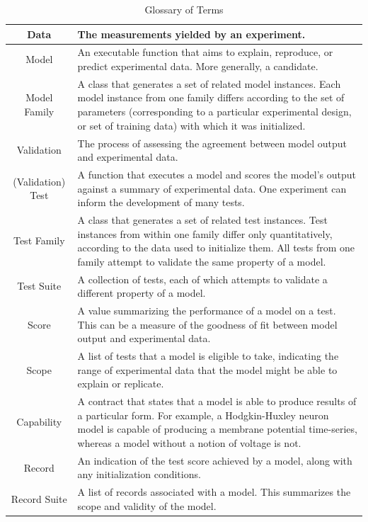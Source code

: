 \documentclass[11pt,letterpaper]{article}
\begin{document}
\begin{table}[h]\footnotesize
\caption{Glossary of Terms}
\label{table:glossary}
\begin{tabular}{| c | p{13cm} |}
\hline
Data & The measurements yielded by an experiment.\\ \hline  
Model & An executable function that aims to explain, reproduce, or predict experimental data.  More generally, a candidate.\\ \hline
Model Family & A class that generates a set of related model instances. Each model instance from one family differs according to the set of parameters (corresponding to a particular experimental design, or set of training data) with which it was initialized.\\ \hline  
Validation	 & The process of assessing the agreement between model output and experimental data.\\ \hline
(Validation) Test & A function that executes a model and scores the model’s output against a summary of experimental data. One experiment can inform the development of many tests.\\ \hline  
Test Family & A class that generates a set of related test instances.  Test instances from within one family differ only quantitatively, according to the data used to initialize them.  All tests from one family attempt to validate the same property of a model.\\ \hline
Test Suite & A collection of tests, each of which attempts to validate a different property of a model.\\ \hline  
Score & A value summarizing the performance of a model on a test. This can be a measure of the goodness of fit between model output and experimental data.\\ \hline
Scope & A list of tests that a model is eligible to take, indicating the range of experimental data that the model might be able to explain or replicate.\\ \hline
Capability & 	A contract that states that a model is able to produce results of a particular form. For example, a Hodgkin-Huxley neuron model is capable of producing a membrane potential time-series, whereas a model without a notion of voltage is not.\\ \hline
Record & An indication of the test score achieved by a model, along with any initialization conditions.\\ \hline
Record Suite & A list of records associated with a model.  This summarizes the scope and validity of the model.\\ \hline  
\end{tabular}
\end{table}
\end{document}
